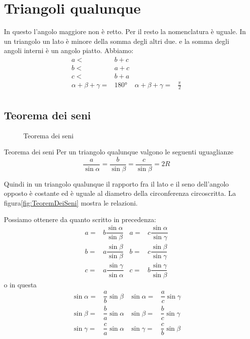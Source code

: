 \section{Triangoli qualunque}
In questo l'angolo maggiore non è  retto. Per il resto la nomenclatura è uguale. In un triangolo un lato è minore della somma degli altri due. e la somma degli angoli interni è un angolo piatto. Abbiamo:
 \begin{align*}
a<&b+c\\
b<&a+c\\
c<&b+a\\
\alpha+\beta+\gamma=&\ang{180}&\alpha+\beta+\gamma=&\frac{\pi}{2}\\
\end{align*}
\subsection{Teorema dei seni}
\begin{figure}
	\centering
	
	\caption{Teorema dei seni}
	\label{fig:TeoremDeiSeni}
\end{figure}
\begin{teoremat}{Teorema dei seni}{}
Per un triangolo qualunque valgono le seguenti uguaglianze\[\dfrac{a}{\sin\alpha}=\dfrac{b}{\sin\beta}=\dfrac{c}{\sin\beta}=2R \]
\end{teoremat}
Quindi in un triangolo qualunque il rapporto fra il lato e il seno dell'angolo opposto è costante ed è uguale al diametro della circonferenza circoscritta. La figura\nobs\vref{fig:TeoremDeiSeni} mostra le relazioni.

Possiamo ottenere da quanto scritto in precedenza: 
\begin{align*}
a=&b\dfrac{\sin\alpha}{\sin\beta}& a=&c\dfrac{\sin\alpha}{\sin\gamma}\\
b=&a\dfrac{\sin\beta}{\sin\beta}& b=&c\dfrac{\sin\beta}{\sin\gamma}\\
c=&a\dfrac{\sin\gamma}{\sin\alpha}& c=&b\dfrac{\sin\gamma}{\sin\beta}
\end{align*}
o in questa
\begin{align*}
\sin\alpha=&\dfrac{a}{b}\sin\beta&\sin\alpha=&\dfrac{a}{c}\sin\gamma\\
\sin\beta=&\dfrac{b}{a}\sin\alpha&\sin\beta=&\dfrac{b}{c}\sin\gamma\\
\sin\gamma=&\dfrac{c}{a}\sin\alpha&\sin\gamma=&\dfrac{c}{b}\sin\beta\\
\end{align*}
